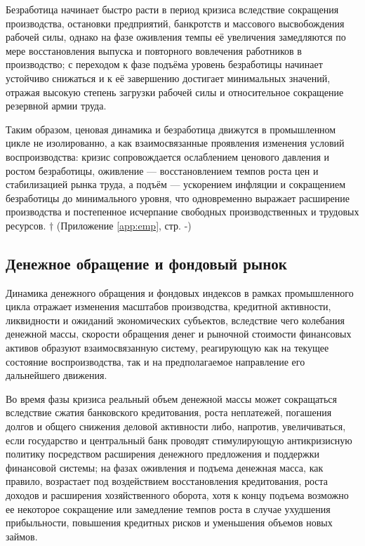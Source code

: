 Безработица начинает быстро расти в период кризиса вследствие сокращения производства, остановки предприятий, банкротств и массового высвобождения рабочей силы, однако на фазе оживления темпы её увеличения замедляются по мере восстановления выпуска и повторного вовлечения работников в производство; с переходом к фазе подъёма уровень безработицы начинает устойчиво снижаться и к её завершению достигает минимальных значений, отражая высокую степень загрузки рабочей силы и относительное сокращение резервной армии труда.

Таким образом, ценовая динамика и безработица движутся в промышленном цикле не изолированно, а как взаимосвязанные проявления изменения условий воспроизводства: кризис сопровождается ослаблением ценового давления и ростом безработицы, оживление — восстановлением темпов роста цен и стабилизацией рынка труда, а подъём — ускорением инфляции и сокращением безработицы до минимального уровня, что одновременно выражает расширение производства и постепенное исчерпание свободных производственных и трудовых ресурсов. $\dagger$ (Приложение \ref{app:emp}, стр. \pageref{fig:prices}-\pageref{fig:unemployment})

\subsection{Денежное обращение и фондовый рынок}
Динамика денежного обращения и фондовых индексов в рамках промышленного цикла отражает изменения масштабов производства, кредитной активности, ликвидности и ожиданий экономических субъектов, вследствие чего колебания денежной массы, скорости обращения денег и рыночной стоимости финансовых активов образуют взаимосвязанную систему, реагирующую как на текущее состояние воспроизводства, так и на предполагаемое направление его дальнейшего движения.

Во время фазы кризиса реальный объем денежной массы может сокращаться вследствие сжатия банковского кредитования, роста неплатежей, погашения долгов и общего снижения деловой активности либо, напротив, увеличиваться, если государство и центральный банк проводят стимулирующую антикризисную политику посредством расширения денежного предложения и поддержки финансовой системы; на фазах оживления и подъема денежная масса, как правило, возрастает под воздействием восстановления кредитования, роста доходов и расширения хозяйственного оборота, хотя к концу подъема возможно ее некоторое сокращение или замедление темпов роста в случае ухудшения прибыльности, повышения кредитных рисков и уменьшения объемов новых займов.

